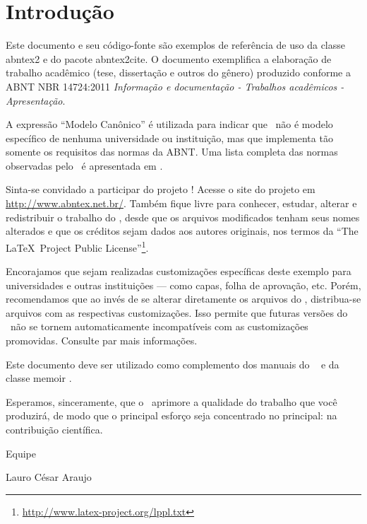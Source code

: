 \documentclass[
12pt,				%
openright,			%
twoside,			%
a4paper,			%
chapter=TITLE,		%
english,			%
brazil				%
]{abntex2}
\begin{document}
\chapter{Introdução}


Este documento e seu código-fonte são exemplos de referência de uso da classe
\textsf{abntex2} e do pacote \textsf{abntex2cite}. O documento 
exemplifica a elaboração de trabalho acadêmico (tese, dissertação e outros do
gênero) produzido conforme a ABNT NBR 14724:2011 \emph{Informação e documentação
- Trabalhos acadêmicos - Apresentação}.

A expressão ``Modelo Canônico'' é utilizada para indicar que \abnTeX\ não é
modelo específico de nenhuma universidade ou instituição, mas que implementa tão
somente os requisitos das normas da ABNT. Uma lista completa das normas
observadas pelo \abnTeX\ é apresentada em \textcite{abntex2classe}.

Sinta-se convidado a participar do projeto \abnTeX! Acesse o site do projeto em
\url{http://www.abntex.net.br/}. Também fique livre para conhecer,
estudar, alterar e redistribuir o trabalho do \abnTeX, desde que os arquivos
modificados tenham seus nomes alterados e que os créditos sejam dados aos
autores originais, nos termos da ``The \LaTeX\ Project Public
License''\footnote{\url{http://www.latex-project.org/lppl.txt}}.

Encorajamos que sejam realizadas customizações específicas deste exemplo para
universidades e outras instituições --- como capas, folha de aprovação, etc.
Porém, recomendamos que ao invés de se alterar diretamente os arquivos do
\abnTeX, distribua-se arquivos com as respectivas customizações.
Isso permite que futuras versões do \abnTeX~não se tornem automaticamente
incompatíveis com as customizações promovidas. Consulte
\textcite{abntex2-wiki-como-customizar} par mais informações.

Este documento deve ser utilizado como complemento dos manuais do \abnTeX\ 
\cite{abntex2classe,abntex2cite,abntex2cite-alf} e da classe \textsf{memoir}
\cite{memoir}. 

Esperamos, sinceramente, que o \abnTeX\ aprimore a qualidade do trabalho que
você produzirá, de modo que o principal esforço seja concentrado no principal:
na contribuição científica.

Equipe \abnTeX 

Lauro César Araujo

\end{document}
